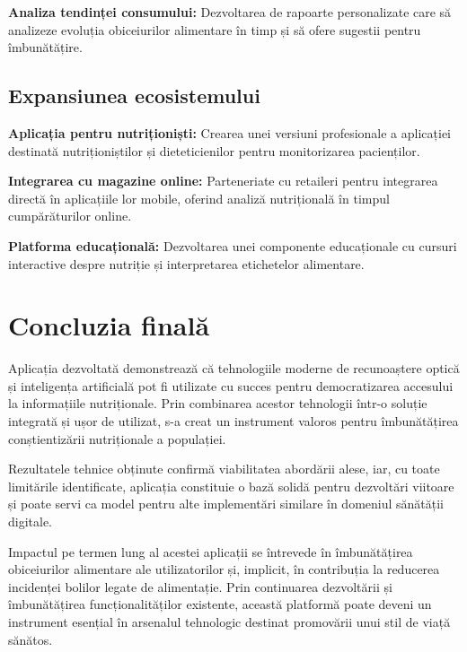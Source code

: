 \textbf{Analiza tendinței consumului:} Dezvoltarea de rapoarte personalizate care să analizeze evoluția obiceiurilor alimentare în timp și să ofere sugestii pentru îmbunătățire.

\subsection{Expansiunea ecosistemului}

\textbf{Aplicația pentru nutriționiști:} Crearea unei versiuni profesionale a aplicației destinată nutriționiștilor și dieteticienilor pentru monitorizarea pacienților.

\textbf{Integrarea cu magazine online:} Parteneriate cu retaileri pentru integrarea directă în aplicațiile lor mobile, oferind analiză nutrițională în timpul cumpărăturilor online.

\textbf{Platforma educațională:} Dezvoltarea unei componente educaționale cu cursuri interactive despre nutriție și interpretarea etichetelor alimentare.

\section{Concluzia finală}

Aplicația dezvoltată demonstrează că tehnologiile moderne de recunoaștere optică și inteligența artificială pot fi utilizate cu succes pentru democratizarea accesului la informațiile nutriționale. Prin combinarea acestor tehnologii într-o soluție integrată și ușor de utilizat, s-a creat un instrument valoros pentru îmbunătățirea conștientizării nutriționale a populației.

Rezultatele tehnice obținute confirmă viabilitatea abordării alese, iar, cu toate limitările identificate, aplicația constituie o bază solidă pentru dezvoltări viitoare și poate servi ca model pentru alte implementări similare în domeniul sănătății digitale.

Impactul pe termen lung al acestei aplicații se întrevede în îmbunătățirea obiceiurilor alimentare ale utilizatorilor și, implicit, în contribuția la reducerea incidenței bolilor legate de alimentație. Prin continuarea dezvoltării și îmbunătățirea funcționalităților existente, această platformă poate deveni un instrument esențial în arsenalul tehnologic destinat promovării unui stil de viață sănătos.